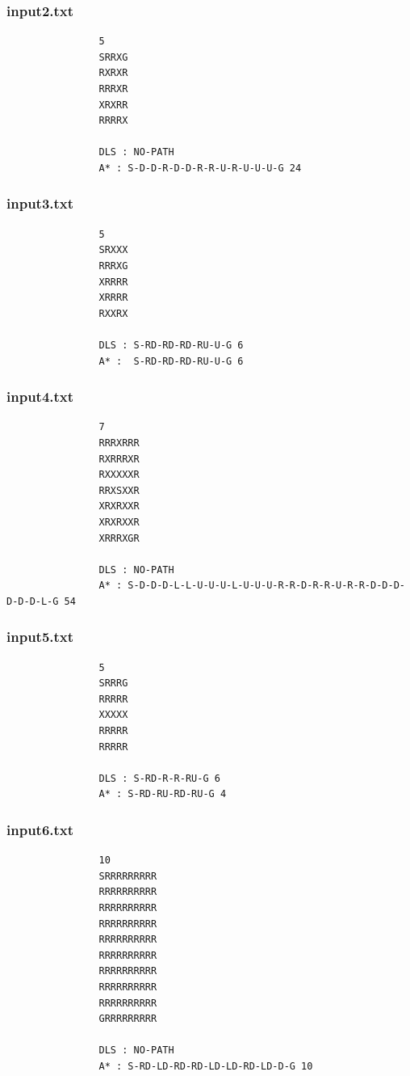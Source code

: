 \documentclass{article}
\begin{document}
	\subsubsection{input2.txt}
		\begin{lstlisting}
				5
				SRRXG
				RXRXR
				RRRXR
				XRXRR
				RRRRX
				
				DLS : NO-PATH
				A* : S-D-D-R-D-D-R-R-U-R-U-U-U-G 24
		\end{lstlisting}
	
	\subsubsection{input3.txt}
		\begin{lstlisting}
				5
				SRXXX
				RRRXG
				XRRRR
				XRRRR
				RXXRX
		
				DLS : S-RD-RD-RD-RU-U-G 6
				A* :  S-RD-RD-RD-RU-U-G 6
		\end{lstlisting}
	
	\subsubsection{input4.txt}
		\begin{lstlisting}
				7
				RRRXRRR
				RXRRRXR
				RXXXXXR
				RRXSXXR
				XRXRXXR
				XRXRXXR
				XRRRXGR
				
				DLS : NO-PATH
				A* : S-D-D-D-L-L-U-U-U-L-U-U-U-R-R-D-R-R-U-R-R-D-D-D-D-D-D-L-G 54
		\end{lstlisting}
	
	\subsubsection{input5.txt}
		\begin{lstlisting}
				5
				SRRRG
				RRRRR
				XXXXX
				RRRRR
				RRRRR
				
				DLS : S-RD-R-R-RU-G 6
				A* : S-RD-RU-RD-RU-G 4
		\end{lstlisting}
		\newpage
	\subsubsection{input6.txt}
		\begin{lstlisting}
				10
				SRRRRRRRRR
				RRRRRRRRRR
				RRRRRRRRRR
				RRRRRRRRRR
				RRRRRRRRRR
				RRRRRRRRRR
				RRRRRRRRRR
				RRRRRRRRRR
				RRRRRRRRRR
				GRRRRRRRRR
				
				DLS : NO-PATH
				A* : S-RD-LD-RD-RD-LD-LD-RD-LD-D-G 10
		\end{lstlisting}
\end{document}
